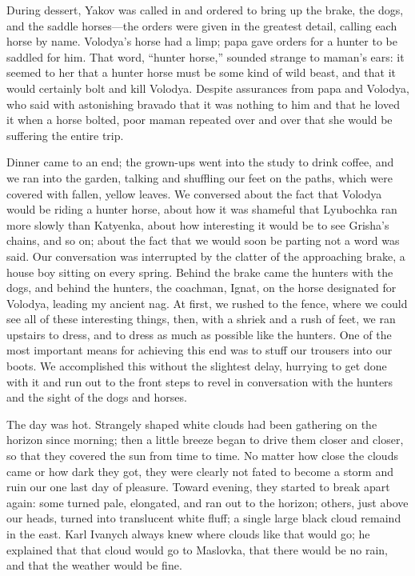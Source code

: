 During dessert, Yakov was called in and ordered to bring up the brake, the dogs, and the saddle horses---the orders were given in the greatest detail, calling each horse by name. Volodya's horse had a limp; papa gave orders for a hunter to be saddled for him. That word, ``hunter horse,'' sounded strange to maman's ears: it seemed to her that a hunter horse must be some kind of wild beast, and that it would certainly bolt and kill Volodya. Despite assurances from papa and Volodya, who said with astonishing bravado that it was nothing to him and that he loved it when a horse bolted, poor maman repeated over and over that she would be suffering the entire trip.

Dinner came to an end; the grown-ups went into the study to drink coffee, and we ran into the garden, talking and shuffling our feet on the paths, which were covered with fallen, yellow leaves. We conversed about the fact that Volodya would be riding a hunter horse, about how it was shameful that Lyubochka ran more slowly than Katyenka, about how interesting it would be to see Grisha's chains, and so on; about the fact that we would soon be parting not a word was said. Our conversation was interrupted by the clatter of the approaching brake, a house boy sitting on every spring. Behind the brake came the hunters with the dogs, and behind the hunters, the coachman, Ignat, on the horse designated for Volodya, leading my ancient nag. At first, we rushed to the fence, where we could see all of these interesting things, then, with a shriek and a rush of feet, we ran upstairs to dress, and to dress as much as possible like the hunters. One of the most important means for achieving this end was to stuff our trousers into our boots. We accomplished this without the slightest delay, hurrying to get done with it and run out to the front steps to revel in conversation with the hunters and the sight of the dogs and horses.

The day was hot. Strangely shaped white clouds had been gathering on the horizon since morning; then a little breeze began to drive them closer and closer, so that they covered the sun from time to time. No matter how close the clouds came or how dark they got, they were clearly not fated to become a storm and ruin our one last day of pleasure. Toward evening, they started to break apart again: some turned pale, elongated, and ran out to the horizon; others, just above our heads, turned into translucent white fluff; a single large black cloud remaind in the east. Karl Ivanych always knew where clouds like that would go; he explained that that cloud would go to Maslovka, that there would be no rain, and that the weather would be fine.

